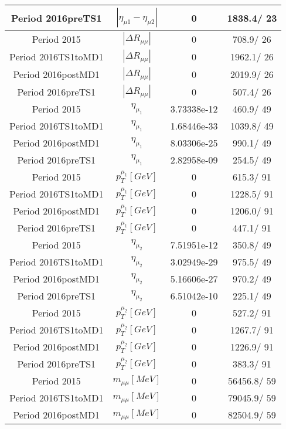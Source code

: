 \documentclass{article}
\begin{document}
\begin{longtable}{c|c|c|c}
\hline
 Period 2016preTS1 & $|\eta_{\mu1}-\eta_{\mu2}|$ & 0 & 1838.4/ 23\\
\hline
 Period 2015 & $|\Delta R_{\mu \mu}|$ & 0 & 708.9/ 26\\
\hline
 Period 2016TS1toMD1 & $|\Delta R_{\mu \mu}|$ & 0 & 1962.1/ 26\\
\hline
 Period 2016postMD1 & $|\Delta R_{\mu \mu}|$ & 0 & 2019.9/ 26\\
\hline
 Period 2016preTS1 & $|\Delta R_{\mu \mu}|$ & 0 & 507.4/ 26\\
\hline
 Period 2015 & $\eta_{\mu_{1}}$ & 3.73338e-12 & 460.9/ 49\\
\hline
 Period 2016TS1toMD1 & $\eta_{\mu_{1}}$ & 1.68446e-33 & 1039.8/ 49\\
\hline
 Period 2016postMD1 & $\eta_{\mu_{1}}$ & 8.03306e-25 & 990.1/ 49\\
\hline
 Period 2016preTS1 & $\eta_{\mu_{1}}$ & 2.82958e-09 & 254.5/ 49\\
\hline
 Period 2015 & $p_{T}^{\mu_{1}} [GeV]$ & 0 & 615.3/ 91\\
\hline
 Period 2016TS1toMD1 & $p_{T}^{\mu_{1}} [GeV]$ & 0 & 1228.5/ 91\\
\hline
 Period 2016postMD1 & $p_{T}^{\mu_{1}} [GeV]$ & 0 & 1206.0/ 91\\
\hline
 Period 2016preTS1 & $p_{T}^{\mu_{1}} [GeV]$ & 0 & 447.1/ 91\\
\hline
 Period 2015 & $\eta_{\mu_{2}}$ & 7.51951e-12 & 350.8/ 49\\
\hline
 Period 2016TS1toMD1 & $\eta_{\mu_{2}}$ & 3.02949e-29 & 975.5/ 49\\
\hline
 Period 2016postMD1 & $\eta_{\mu_{2}}$ & 5.16606e-27 & 970.2/ 49\\
\hline
 Period 2016preTS1 & $\eta_{\mu_{2}}$ & 6.51042e-10 & 225.1/ 49\\
\hline
 Period 2015 & $p_{T}^{\mu_{2}} [GeV]$ & 0 & 527.2/ 91\\
\hline
 Period 2016TS1toMD1 & $p_{T}^{\mu_{2}} [GeV]$ & 0 & 1267.7/ 91\\
\hline
 Period 2016postMD1 & $p_{T}^{\mu_{2}} [GeV]$ & 0 & 1226.9/ 91\\
\hline
 Period 2016preTS1 & $p_{T}^{\mu_{2}} [GeV]$ & 0 & 383.3/ 91\\
\hline
 Period 2015 & $m_{\mu\mu} [MeV]$ & 0 & 56456.8/ 59\\
\hline
 Period 2016TS1toMD1 & $m_{\mu\mu} [MeV]$ & 0 & 79045.9/ 59\\
\hline
 Period 2016postMD1 & $m_{\mu\mu} [MeV]$ & 0 & 82504.9/ 59\\

\end{longtable}
\end{document}
